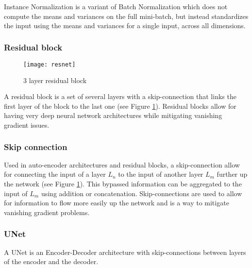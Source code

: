 Instance Normalization \citep{Ulyanov2016} is a variant of Batch Normalization which does not compute the means and variances on the full mini-batch, but instead standardizes the input using the means and variances for a single input, across all dimensions.

\subsubsection*{Residual block} \label{gl:resblock}

\begin{figure}
	\centering
	\texttt{[image: resnet]}
	\caption{3 layer residual block}
	\label{fig:resblock}
\end{figure}

A residual block is a set of several layers with a skip-connection that links the first layer of the block to the last one (see Figure \ref{fig:resblock}). Residual blocks allow for having very deep neural network architectures while mitigating vanishing gradient issues.

\subsubsection*{Skip connection} \label{gl:skip}

Used in auto-encoder architectures and residual blocks, a skip-connection allow for connecting the input of a layer $L_n$ to the input of another layer $L_m$ further up the network (see Figure \ref{fig:resblock}). This bypassed information can be aggregated to the input of $L_m$ using addition or concatenation. Skip-connections are used to allow for information to flow more easily up the network and is a way to mitigate vanishing gradient problems.

\subsubsection*{UNet} \label{gl:unet} A UNet  \citep{Ronneberger2015} is an Encoder-Decoder architecture with skip-connections between layers of the encoder and the decoder.